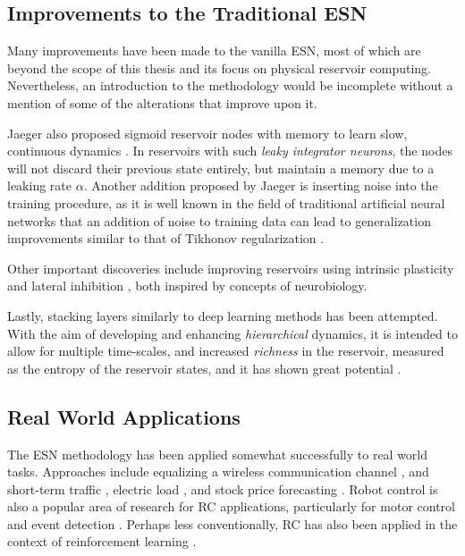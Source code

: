 \subsection{Improvements to the Traditional ESN}

Many improvements have been made to the vanilla ESN, most of which are beyond
the scope of this thesis and its focus on physical reservoir
computing. Nevertheless, an introduction to the methodology would be incomplete
without a mention of some of the alterations that improve upon it.

Jaeger also proposed sigmoid reservoir nodes with memory to learn slow,
continuous dynamics \cite{jaeger_echo_2001}. In reservoirs with such
\textit{leaky integrator neurons}, the nodes will not discard their previous
state entirely, but maintain a memory due to a leaking rate $\alpha$. Another
addition proposed by Jaeger is inserting noise into the training procedure, as
it is well known in the field of traditional artificial neural networks that an
addition of noise to training data can lead to generalization improvements
similar to that of Tikhonov regularization \cite{bishop_training_1995}.

Other important discoveries include improving reservoirs using intrinsic
plasticity \cite{schrauwen_improving_2008} and lateral inhibition
\cite{xue_decoupled_2007}, both inspired by concepts of neurobiology.

Lastly, stacking layers similarly to deep learning methods has been
attempted. With the aim of developing and enhancing \textit{hierarchical}
dynamics, it is intended to allow for multiple time-scales, and increased
\textit{richness} in the reservoir, measured as the entropy of the reservoir
states, and it has shown great potential \cite{gallicchio_deep_2017}.

\subsection{Real World Applications}

The ESN methodology has been applied somewhat successfully to real world
tasks. Approaches include equalizing a wireless communication channel
\cite{jaeger_harnessing_2004}, and short-term traffic \cite{an_short-term_2011},
electric load \cite{song_hourly_2011}, and stock price forecasting
\cite{lin_short-term_2009}. Robot control is also a popular area of research for
RC applications, particularly for motor control and event detection
\cite{aislan_antonelo_learning_2015, harding_evolution_2005,
hutchison_movement_2004}. Perhaps less conventionally, RC has also been applied
in the context of reinforcement learning \cite{bush_modeling_2005}.

